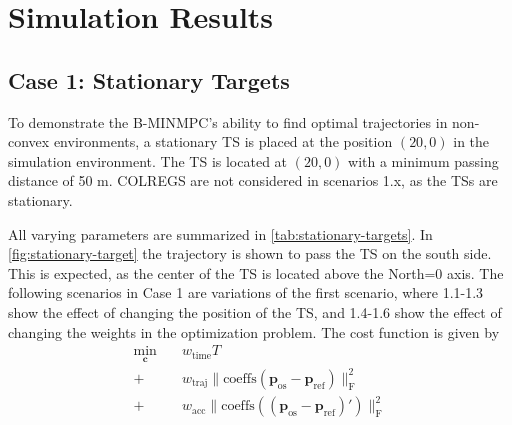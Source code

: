 \section{Simulation Results}\label{sec:simulation-results}


\subsection{Case 1: Stationary Targets}
\label{sec:case-1-stationary-targets}

To demonstrate the B-MINMPC's ability to find optimal trajectories in non-convex environments, a stationary TS is placed at the position $(20, 0)$ in the simulation environment. The TS is located at $(20, 0)$ with a minimum passing distance of 50 m. COLREGS are not considered in scenarios 1.x, as the TSs are stationary. 

All varying parameters are summarized in \cref{tab:stationary-targets}. In \cref{fig:stationary-target} the trajectory is shown to pass the TS on the south side. This is expected, as the center of the TS is located above the North=0 axis. The following scenarios in Case 1 are variations of the first scenario, where 1.1-1.3 show the effect of changing the position of the TS, and 1.4-1.6 show the effect of changing the weights in the optimization problem. The cost function is given by
\begin{equation}
    \begin{aligned}
        \min_{\mathbf c} \quad & w_\text{time} T \\
        + & w_\text{traj}\|\text{coeffs}(\mathbf p_\text{os} - \mathbf p_\text{ref})\|_\text{F}^2 \\
        + & w_\text{acc}\|\text{coeffs}((\mathbf p_\text{os} - \mathbf{p}_\text{ref})')\|_\text{F}^2
    \end{aligned}
\end{equation}



